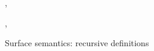 \begin{figure}
   {\small, \flushleft {}
      \begin{smathpar}
         {
            \upgamma,  \desugarFwdS {}
         }
      \end{smathpar}}
   \caption{Surface semantics: recursive definitions}
\end{figure}
